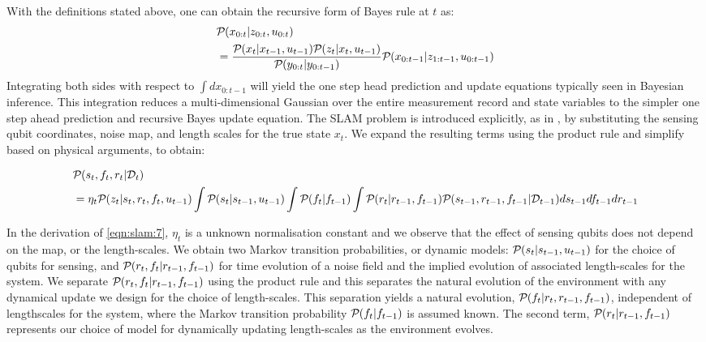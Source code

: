 \\
With the definitions stated above, one can obtain the recursive form of Bayes rule at $t$ as:
\begin{align}
&\mathcal{P}_{} ( x_{0:t} | z_{0:t}, u_{0:t} ) \nonumber \\ 
& = \frac{\mathcal{P}_{} ( x_{t}| x_{t-1}, u_{t-1}  ) \mathcal{P}_{} ( z_{t}| x_{t}, u_{t-1}  )}{\mathcal{P}_{} ( y_{0:t} | y_{0:t-1} )}\mathcal{P}_{} ( x_{0:t-1} | z_{1:t-1}, u_{0:t-1} )
\end{align} Integrating both sides with respect to $\int dx_{0:t-1}$ will yield the one step head prediction and update equations typically seen in Bayesian inference. This integration reduces a multi-dimensional Gaussian over the entire measurement record and state variables to the simpler one step ahead prediction and recursive Bayes update equation.
The SLAM problem is introduced explicitly, as in \cite{thrun2001probabilistic}, by substituting the sensing qubit coordinates, noise map, and length scales for the true state $x_t$.	We expand the resulting terms  using the product rule and simplify based on physical arguments, to obtain: 
 \begin{widetext}
  	\begin{align}
  	&\mathcal{P}_{} ( s_t, f_{ t}, r_t | \mathcal{D}_t ) \nonumber \\
  	& = \eta_t\mathcal{P}_{} ( z_t | s_t, r_t, f_{ t}, u_{t-1} ) \int \mathcal{P}_{} (  s_t| s_{t-1}, u_{t-1} )  \int \mathcal{P}_{} (  f_{ t}|  f_{ t-1} ) \int \mathcal{P}_{} (  r_t|  r_{t-1}, f_{ t-1} ) \mathcal{P}_{} ( s_{t-1}, r_{t-1}, f_{ t-1}| \mathcal{D}_{t-1} )  ds_{t-1} df_{ t-1} dr_{t-1}   \label{eqn:slam:7} 
  	\end{align} 
  \end{widetext} In the derivation of \cref{eqn:slam:7}, $\eta_t$ is a unknown normalisation constant and we observe that the effect of sensing qubits does not depend on the map, or the length-scales.  We obtain two Markov transition probabilities, or dynamic models:  $\mathcal{P}_{} (  s_t| s_{t-1}, u_{t-1} )$ for the choice of qubits for sensing, and $\mathcal{P}_{} (  r_t, f_{ t}|  r_{t-1}, f_{ t-1} )$ for time evolution of a noise field and the implied evolution of associated length-scales for the system. We separate $\mathcal{P}_{} (  r_t, f_{ t}|  r_{t-1}, f_{ t-1} )$ using the product rule and this separates the natural evolution of the environment with any dynamical update we design for the choice of length-scales. This separation yields a natural evolution, $\mathcal{P}_{} (   f_{ t}|  r_t, r_{t-1}, f_{ t-1} ) $,  independent of lengthscales for the system, where the Markov transition probability $\mathcal{P}_{} (  f_{ t}|  f_{ t-1} )$ is assumed known. The second term, $\mathcal{P}_{} (  r_t|  r_{t-1}, f_{ t-1} )$ represents our choice of model for dynamically updating length-scales as the environment evolves.\\
